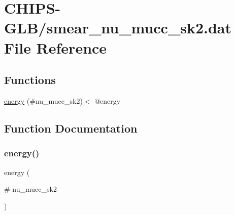 \hypertarget{smear__nu__mucc__sk2_8dat}{}\section{C\+H\+I\+P\+S-\/\+G\+L\+B/smear\+\_\+nu\+\_\+mucc\+\_\+sk2.dat File Reference}
\label{smear__nu__mucc__sk2_8dat}
\subsection*{Functions}
\begin{DoxyCompactItemize}
\item 
\hyperlink{smear__nu__mucc__sk2_8dat_a66ef51584de2e7da796f43de37f9a43f}{energy} (\#nu\+\_\+mucc\+\_\+sk2)$<$ @energy
\end{DoxyCompactItemize}


\subsection{Function Documentation}
\mbox{\label{smear__nu__mucc__sk2_8dat_a66ef51584de2e7da796f43de37f9a43f}} 
\subsubsection{\texorpdfstring{energy()}{energy()}}
{\footnotesize\ttfamily energy (\begin{DoxyParamCaption}\item[{\#}]{nu\+\_\+mucc\+\_\+sk2 }\end{DoxyParamCaption})}

